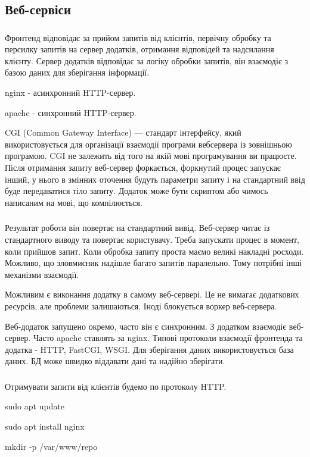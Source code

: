 \documentclass[t]{beamer}  %
\begin{document}
\subsection{Веб-сервіси}

\begin{frame}
 	\frametitle{\insertsection} 
 	\framesubtitle{\insertsubsection} 	
Фронтенд відповідає за прийом запитів від клієнтів, первічну обробку та персилку запитів на сервер додатків, отримання відповідей та надсилання клієнту. Сервер додатків відповідає за логіку обробки запитів, він взаємодіє з базою даних для зберігання інформації.

nginx - асинхронний HTTP-сервер.

apache - синхронний HTTP-сервер.

CGI (Common Gateway Interface) — стандарт інтерфейсу, який використовується для організації взаємодії програми вебсервера із зовнішньою програмою. CGI не залежить від того на якій мові програмування ви працюєте. Після отримання запиту веб-сервер форкається, форкнутий процес запускає інший, у нього в змінних оточення будуть параметри запиту і на стандартний ввід буде передаватися тіло запиту. Додаток може бути скриптом або чимось написаним на мові, що компілюється. 

\end{frame}

\begin{frame}
 	\frametitle{\insertsection} 
 	\framesubtitle{\insertsubsection} 	
Результат роботи він повертає на стандартний вивід. Веб-сервер читає із стандартного виводу та повертає користувачу. Треба запускати процес в момент, коли прийшов запит. Коли обробка запиту проста маємо великі накладні росходи. Можливо, що зловмисник надішле багато запитів паралельно. Тому потрібні інші механізми взаємодії.

Можливим є виконання додатку в самому веб-сервері. Це не вимагає додаткових ресурсів, але проблеми залишаються. Іноді блокується воркер веб-сервера.

Веб-додаток запущено окремо, часто він є синхронним. З додатком взаємодіє веб-сервер. Часто apache ставлять за nginx. Типові протоколи взаємодії фронтенда та додатка - HTTP, FastCGI, WSGI. Для зберігання даних використовується база даних. БД може швидко віддавати дані та надійно зберігати.
\end{frame}

\begin{frame}
 	\frametitle{\insertsection} 
 	\framesubtitle{\insertsubsection}
Отримувати запити від клієнтів будемо по протоколу  HTTP.

sudo apt update

sudo apt install nginx

mkdir -p /var/www/repo


\end{frame}
\end{document}

